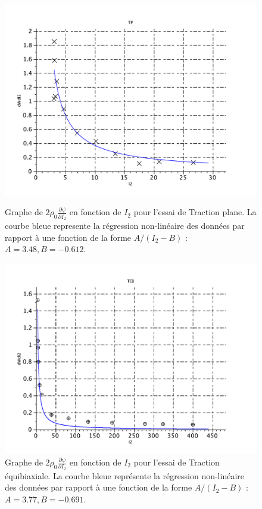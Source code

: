 \documentclass[a4paper,11pt]{article}
\begin{document}
\begin{figure}[!h]
\begin{minipage}{0.49\linewidth}
	\centering\includegraphics[scale=0.45]{scilab_prof/q412.pdf}
	\caption{Graphe de $2 \rho_0 \frac{\partial\psi}{\partial I_2}$ en fonction de $I_2$ pour l'essai de Traction plane. La courbe bleue represente la régression non-linéaire des données par rapport à une fonction de la forme $A/(I_2-B)$ : $A = 3.48, B = -0.612$.}
\label{fig:412}
\end{minipage}
	\hfill
\begin{minipage}{0.49\linewidth}
	\centering\includegraphics[scale=0.45]{scilab_prof/q413.pdf}
	\caption{Graphe de $2 \rho_0 \frac{\partial\psi}{\partial I_2}$ en fonction de $I_2$ pour l'essai de Traction équibiaxiale. La courbe bleue représente la régression non-linéaire des données par rapport à une fonction de la forme $A/(I_2-B)$ : $A = 3.77, B = -0.691$.}
\label{fig:413}
\end{minipage}
\end{figure}
\end{document}
